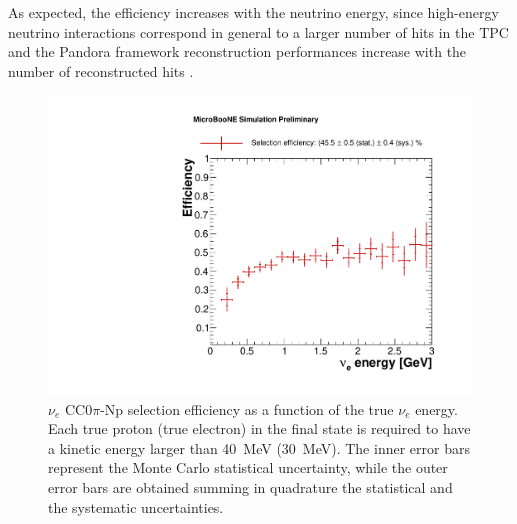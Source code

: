 As expected, the efficiency increases with the neutrino energy, since high-energy neutrino interactions correspond in general to a larger number of hits in the TPC and the Pandora framework reconstruction performances increase with the number of reconstructed hits \cite{Acciarri:2017hat}. 



\begin{figure}
\centering
    \includegraphics[width=0.8\linewidth]{figures/eff.pdf}
  \caption{$\nu_{e}$ CC$0\pi$-Np selection efficiency as a function of the true $\nu_{e}$ energy. Each true proton (true electron) in the final state is required to have a kinetic energy larger than 40~MeV (30~MeV). The inner error bars represent the Monte Carlo statistical uncertainty, while the outer error bars are obtained summing in quadrature the statistical and the systematic uncertainties.}
  \label{fig:effpurity}
\end{figure}


